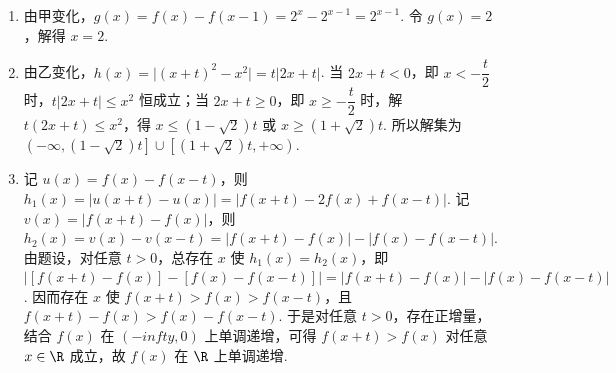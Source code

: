 \begin{solution}
\begin{enumerate}
\item 由甲变化，\(g(x)=f(x)-f(x-1)=2^x-2^{x-1}=2^{x-1}\). 令 \(g(x)=2\)，解得 \(x=2\).
\item 由乙变化，\(h(x)=\lvert(x+t)^2-x^2\rvert=t\lvert2x+t\rvert\). 当 \(2x+t<0\)，即 \(x<-\dfrac t2\) 时，\(t\lvert2x+t\rvert\le x^2\) 恒成立；当 \(2x+t\ge0\)，即 \(x\ge-\dfrac t2\) 时，解 \(t(2x+t)\le x^2\)，得 \(x\le(1-\sqrt2)t\) 或 \(x\ge(1+\sqrt2)t\). 所以解集为 \(\left(-\infty,(1-\sqrt2)t\right]\cup\left[(1+\sqrt2)t,+\infty\right)\).
\item 记 \(u(x)=f(x)-f(x-t)\)，则 \(h_1(x)=\lvert u(x+t)-u(x)\rvert=\lvert f(x+t)-2f(x)+f(x-t)\rvert\). 记 \(v(x)=\lvert f(x+t)-f(x)\rvert\)，则 \(h_2(x)=v(x)-v(x-t)=\lvert f(x+t)-f(x)\rvert-\lvert f(x)-f(x-t)\rvert\). 由题设，对任意 \(t>0\)，总存在 \(x\) 使 \(h_1(x)=h_2(x)\)，即
\(\left\lvert[f(x+t)-f(x)]-[f(x)-f(x-t)]\right\rvert=\lvert f(x+t)-f(x)\rvert-\lvert f(x)-f(x-t)\rvert\). 因而存在 \(x\) 使 \(f(x+t)>f(x)>f(x-t)\)，且 \(f(x+t)-f(x)>f(x)-f(x-t)\). 于是对任意 \(t>0\)，存在正增量，结合 \(f(x)\) 在 \((-infty,0)\) 上单调递增，可得 \(f(x+t)>f(x)\) 对任意 \(x\in\R\) 成立，故 \(f(x)\) 在 \(\R\) 上单调递增.
\end{enumerate}
\end{solution}
